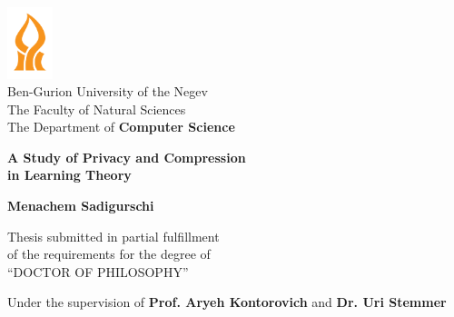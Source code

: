 \begin{titlepage}
    \begin{center}
        
        \includegraphics[width=0.1\textwidth]{bgu}\\
        Ben-Gurion University of the Negev\\
        The Faculty of Natural Sciences\\
        The Department of \textbf{Computer Science}
        
        \vspace{2cm}
        
        {\Large \textbf{A Study of Privacy and Compression \\ in Learning Theory}}
        
        \vspace{1.5cm}
        
        \textbf{Menachem Sadigurschi}
        
        \vspace{1cm}
        
        Thesis submitted in partial fulfillment\\
        of the requirements for the degree of\\
        ``DOCTOR OF PHILOSOPHY''
        
        \vspace{1cm}
        
        Under the supervision of \textbf{Prof. Aryeh Kontorovich} and \textbf{Dr. Uri Stemmer}
        
        \vfill
        
        \textbf{\subdate}
    \end{center}
\end{titlepage}
